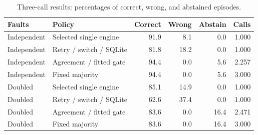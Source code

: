 \begin{table}[!htbp]
\caption{Three-call results: percentages of correct, wrong, and abstained episodes.}
\label{tab:main}
\centering\small
\begin{tabular}{llrrrr}
\toprule
Faults & Policy & Correct & Wrong & Abstain & Calls \\
\midrule
Independent & Selected single engine & 91.9 & 8.1 & 0.0 & 1.000 \\
Independent & Retry / switch / SQLite & 81.8 & 18.2 & 0.0 & 1.000 \\
Independent & Agreement / fitted gate & 94.4 & 0.0 & 5.6 & 2.257 \\
Independent & Fixed majority & 94.4 & 0.0 & 5.6 & 3.000 \\
Doubled & Selected single engine & 85.1 & 14.9 & 0.0 & 1.000 \\
Doubled & Retry / switch / SQLite & 62.6 & 37.4 & 0.0 & 1.000 \\
Doubled & Agreement / fitted gate & 83.6 & 0.0 & 16.4 & 2.471 \\
Doubled & Fixed majority & 83.6 & 0.0 & 16.4 & 3.000 \\
\bottomrule
\end{tabular}
\end{table}
